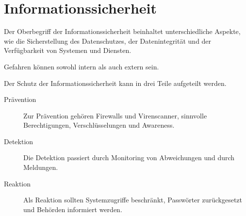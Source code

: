 \documentclass{article}
\begin{document}
\section{Informationssicherheit} 
Der Oberbegriff der Informationssicherheit beinhaltet unterschiedliche Aspekte, wie die Sicherstellung des Datenschutzes, der Datenintegrität und der Verfügbarkeit von Systemen und Diensten.

Gefahren können sowohl intern als auch extern sein.

Der Schutz der Informationssicherheit kann in drei Teile aufgeteilt werden.
\begin{description}
 \item[Prävention] Zur Prävention gehören Firewalls und Virenscanner, sinnvolle Berechtigungen, Verschlüsselungen und Awareness.
 \item[Detektion] Die Detektion passiert durch Monitoring von Abweichungen und durch Meldungen.
 \item[Reaktion] Als Reaktion sollten Systemzugriffe beschränkt, Passwörter zurückgesetzt und Behörden informiert werden.
\end{description}
\end{document}
